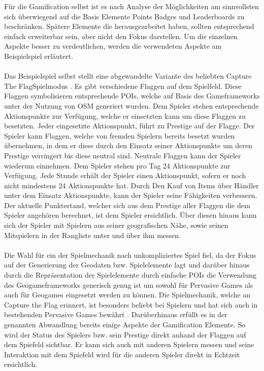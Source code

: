 Für die Gamification selbst ist es nach Analyse der Möglichkeiten am sinnvollsten sich überwiegend auf die Basis Elemente Points Badges und Leaderboards zu beschränken. Spätere Elemente die \textcite{Zichermann.2011} herausgearbeitet haben, sollten entsprechend einfach erweiterbar sein, aber nicht den Fokus darstellen. Um die einzelnen Aspekte besser zu verdeutlichen, werden die verwendeten Aspekte am Beispielspiel erläutert.
\\\\
Das Beispielspiel selbst stellt eine abgewandelte Variante des beliebten Capture The FlagSpielmodus \cite{Atkin.1999}.
Es gibt verschiedene Flaggen auf dem Spielfeld. Diese Flaggen symbolisieren entsprechende POIs, welche auf Basis des Gameframeworks unter der Nutzung von OSM generiert wurden. Dem Spieler stehen entsprechende Aktionspunkte zur Verfügung, welche er einsetzten kann um diese Flaggen zu besetzten. Jeder eingesetzte Aktionspunkt, führt zu \glqq Prestige\grqq{} auf der Flagge. Der Spieler kann Flaggen, welche von fremden Spielern bereits besetzt wurden übernehmen, in dem er diese durch den Einsatz seiner Aktionspunkte um deren Prestige verringert bis diese neutral sind. Neutrale Flaggen kann der Spieler wiederum einnehmen. Dem Spieler stehen pro Tag 24 Aktionspunkte zur Verfügung. Jede Stunde erhält der Spieler einen Aktionspunkt, sofern er noch nicht mindestens 24 Aktionspunkte hat. Durch Den Kauf von Items über Händler unter dem Einsatz Aktionspunkte, kann der Spieler seine Fähigkeiten verbessern. Der aktuelle Punktestand, welcher sich aus dem Prestige aller Flaggen die dem Spieler angehören berechnet, ist dem Spieler ersichtlich. Über diesen hinaus kann sich der Spieler mit Spielern aus seiner geografischen Nähe, sowie seinen Mitspielern in der Rangliste unter und über ihm messen.
\\\\
Die Wahl für ein der Spielmechanik nach unkompliziertes Spiel fiel, da der Fokus auf der Generierung der Geodaten bzw. Spielelemente lagt und darüber hinaus durch die Repräsentation der Spielelemente durch einfache POIs die Verwendung des Geogameframeworks generisch genug ist um sowohl für Pervasive Games als auch für Geogames eingesetzt werden zu können. Die Spielmechanik, welche an Capture the Flag erinnert, ist besonders beliebt bei Spielern und hat sich auch in bestehenden Pervasive Games bewährt \cite{Bell.2006,Ingress.2014}. Darüberhinaus erfüllt es in der genannten Abwandlung bereits einige Aspekte der Gamification Elemente. So wird der Status des Spielers bzw. sein \glqq Prestige\grqq{} direkt anhand der Flaggen auf dem Spiefeld sichtbar. Er kann sich auch mit anderen Spielern messen und seine Interaktion mit dem Spiefeld wird für die anderen Spieler direkt in Echtzeit ersichtlich.
